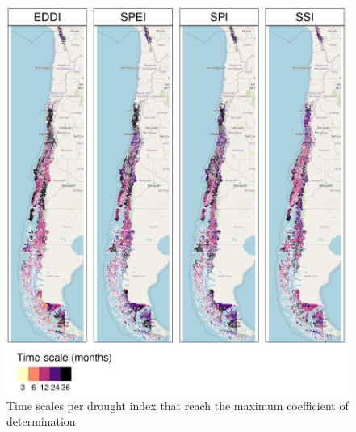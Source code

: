 \documentclass[
  number,
  preprint,
  3p,
  onecolumn]{elsarticle}
\begin{document}
\begin{figure}[!ht]

{\centering \includegraphics{../output/figs/mapa_cor_selec_indices_zcNDVI6.png}

}

\caption{\label{fig-corTimeScale}Time scales per drought index that
reach the maximum coefficient of determination}

\end{figure}
\end{document}
